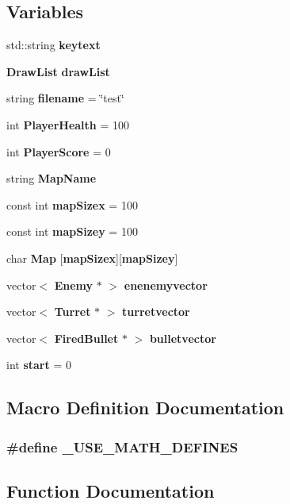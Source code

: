 \subsection*{Variables}
\begin{DoxyCompactItemize}
\item 
std\+::string {\bf keytext}
\item 
{\bf Draw\+List} {\bf draw\+List}
\item 
string {\bf filename} = \char`\"{}test\char`\"{}
\item 
int {\bf Player\+Health} = 100
\item 
int {\bf Player\+Score} = 0
\item 
string {\bf Map\+Name}
\item 
const int {\bf map\+Sizex} = 100
\item 
const int {\bf map\+Sizey} = 100
\item 
char {\bf Map} [{\bf map\+Sizex}][{\bf map\+Sizey}]
\item 
vector$<$ {\bf Enemy} $\ast$ $>$ {\bf enenemyvector}
\item 
vector$<$ {\bf Turret} $\ast$ $>$ {\bf turretvector}
\item 
vector$<$ {\bf Fired\+Bullet} $\ast$ $>$ {\bf bulletvector}
\item 
int {\bf start} = 0
\end{DoxyCompactItemize}


\subsection{Macro Definition Documentation}
\subsubsection[{\+\_\+\+U\+S\+E\+\_\+\+M\+A\+T\+H\+\_\+\+D\+E\+F\+I\+N\+ES}]{\setlength{\rightskip}{0pt plus 5cm}\#define \+\_\+\+U\+S\+E\+\_\+\+M\+A\+T\+H\+\_\+\+D\+E\+F\+I\+N\+ES}\label{main_8cpp_a525335710b53cb064ca56b936120431e}


\subsection{Function Documentation}
